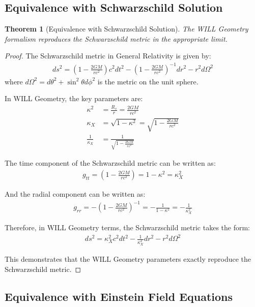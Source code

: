 \documentclass[12pt, a4paper]{article}
\newtheorem{theorem}{Theorem}[section]
\begin{document}
\subsection{Equivalence with Schwarzschild Solution}
\begin{theorem}[Equivalence with Schwarzschild Solution]
The WILL Geometry formalism reproduces the Schwarzschild metric in the appropriate limit.
\end{theorem}
\begin{proof}
The Schwarzschild metric in General Relativity is given by:
\begin{align}
ds^2 = \left(1-\frac{2GM}{rc^2}\right)c^2dt^2 - \left(1-\frac{2GM}{rc^2}\right)^{-1}dr^2 - r^2d\Omega^2
\end{align}
where $d\Omega^2 = d\theta^2 + \sin^2\theta d\phi^2$ is the metric on the unit sphere.

In WILL Geometry, the key parameters are:
\begin{align}
\kappa^2 &= \frac{R_s}{r} = \frac{2GM}{rc^2} \\
\kappa_X &= \sqrt{1-\kappa^2} = \sqrt{1-\frac{2GM}{rc^2}} \\
 \frac{1}{\kappa_X} &= \frac{1}{\sqrt{1-\frac{2GM}{rc^2}}}
\end{align}

The time component of the Schwarzschild metric can be written as:
\begin{align}
g_{tt} = \left(1-\frac{2GM}{rc^2}\right) = 1-\kappa^2 = \kappa_X^2
\end{align}

And the radial component can be written as:
\begin{align}
g_{rr} = -\left(1-\frac{2GM}{rc^2}\right)^{-1} = -\frac{1}{1-\kappa^2} = -\frac{1}{\kappa_X^2} 
\end{align}

Therefore, in WILL Geometry terms, the Schwarzschild metric takes the form:
\begin{align}
ds^2 = \kappa_X^2 c^2dt^2 -\frac{1}{\kappa_X^2}  dr^2 - r^2d\Omega^2
\end{align}

This demonstrates that the WILL Geometry parameters exactly reproduce the Schwarzschild metric.
\end{proof}
\subsection{Equivalence with Einstein Field Equations}
\end{document}

